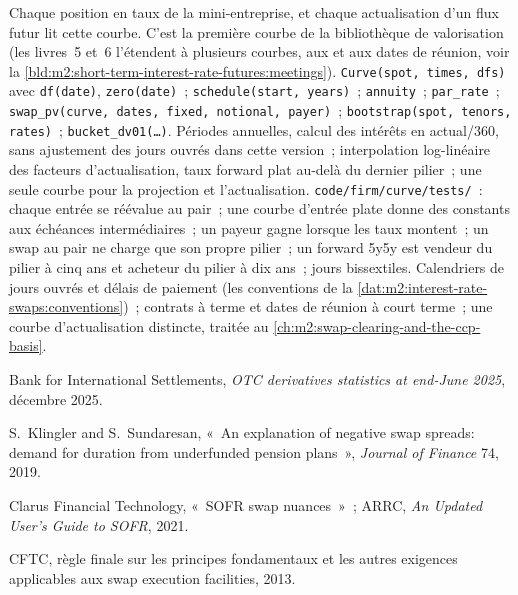 \begin{build}
 Chaque position en taux de la mini-entreprise, et chaque
actualisation d'un flux futur lit cette courbe. C'est la première courbe de la
bibliothèque de valorisation (les livres~5 et~6 l'étendent à plusieurs courbes, aux
 et aux dates de réunion, voir la \cref{bld:m2:short-term-interest-rate-futures:meetings}).
 \texttt{Curve(spot, times, dfs)} avec \texttt{df(date)},
\texttt{zero(date)}~; \texttt{schedule(start, years)}~; \texttt{annuity}~;
\texttt{par\_rate}~; \texttt{swap\_pv(curve, dates, fixed, notional, payer)}~;
\texttt{bootstrap(spot, tenors, rates)}~; \texttt{bucket\_dv01(\ldots)}.
 Périodes annuelles, calcul des intérêts en actual/360, sans ajustement
des jours ouvrés dans cette version~; interpolation log-linéaire des facteurs d'actualisation,
taux forward plat au-delà du dernier pilier~; une seule courbe pour la projection et l'actualisation.
 \texttt{code/firm/curve/tests/}~: chaque entrée se réévalue au pair~;
une courbe d'entrée plate donne des  constants aux échéances intermédiaires~;
un payeur gagne lorsque les taux montent~; un swap au pair ne charge que son propre pilier~;
un forward 5y5y est vendeur du pilier à cinq ans et acheteur du pilier à dix ans~; jours bissextiles.
 Calendriers de jours ouvrés et délais de paiement (les conventions de
la \cref{dat:m2:interest-rate-swaps:conventions})~; contrats à terme et dates de réunion à court
terme~; une courbe d'actualisation distincte, traitée au \cref{ch:m2:swap-clearing-and-the-ccp-basis}.
\end{build}

\begin{omsources}
\item Bank for International Settlements, \emph{OTC derivatives statistics at
end-June 2025}, décembre 2025.
\item S.\ Klingler and S.\ Sundaresan, «~An explanation of negative swap spreads:
demand for duration from underfunded pension plans~», \emph{Journal of
Finance} 74, 2019.
\item Clarus Financial Technology, «~SOFR swap nuances~»~; ARRC, \emph{An
Updated User's Guide to SOFR}, 2021.
\item CFTC, règle finale sur les principes fondamentaux et les autres exigences applicables aux swap
execution facilities, 2013.
\end{omsources}

